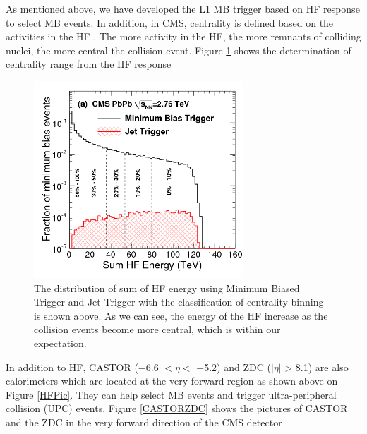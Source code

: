 As mentioned above, we have developed the L1 MB trigger based on HF response to select MB events. In addition, in CMS, centrality is defined based on the activities in the HF \cite{HFCentRef}. The more activity in the HF, the more remnants of colliding nuclei, the more central the collision event. Figure \ref{HFCent} shows the determination of centrality range from the HF response 



\begin{figure}[hbtp]
\begin{center}
\includegraphics[width=0.70\textwidth]{Figures/Chapter2/HFCent.png}
\caption{The distribution of sum of HF energy using Minimum Biased Trigger and Jet Trigger with the classification of centrality binning is shown above. As we can see, the energy of the HF increase as the collision events become more central, which  is within our expectation.}
\label{HFCent}
\end{center}
\end{figure} 



In addition to HF, CASTOR ($-$6.6 $< \eta <$ $-$5.2) and ZDC ($|\eta|$ > 8.1) are also calorimeters which are located at the very forward region \cite{CASZDCRef} as shown above on Figure \ref{HFPic}. They can help select MB events and trigger ultra-peripheral collision (UPC) events. Figure \ref{CASTORZDC} shows the pictures of CASTOR and the ZDC in the very forward direction of the CMS detector

